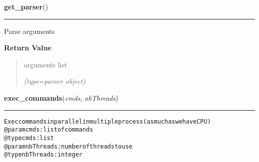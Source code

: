     \vspace{0.5ex}

\hspace{.8\funcindent}\begin{boxedminipage}{\funcwidth}

    \raggedright \textbf{get\_parser}()

    \vspace{-1.5ex}

    \rule{\textwidth}{0.5\fboxrule}
\setlength{\parskip}{2ex}
    Parse arguments

\setlength{\parskip}{1ex}
      \textbf{Return Value}
    \vspace{-1ex}

      \begin{quote}
      arguments list

      {\it (type=parser object)}

      \end{quote}

    \end{boxedminipage}

    \label{script-BAMmaker:exec_commands}

    \vspace{0.5ex}

\hspace{.8\funcindent}\begin{boxedminipage}{\funcwidth}

    \raggedright \textbf{exec\_commands}(\textit{cmds}, \textit{nbThreads})

    \vspace{-1.5ex}

    \rule{\textwidth}{0.5\fboxrule}
\setlength{\parskip}{2ex}
\begin{alltt}

Exec commands in parallel in multiple process (as much as we have CPU)
@param cmds: list of commands
    @type cmds: list
    @param nbThreads: number of threads to use
    @type nbThreads: integer
\end{alltt}

\setlength{\parskip}{1ex}
    \end{boxedminipage}

    \label{script-BAMmaker:exist}

    \vspace{0.5ex}

